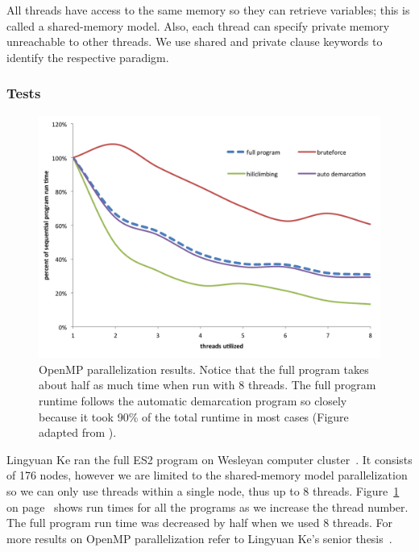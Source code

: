 All threads have access to the same memory so they can retrieve variables; this is called a shared-memory model.
Also, each thread can specify private memory unreachable to other threads.
We use shared and private clause keywords to identify the respective paradigm.

\subsubsection*{Tests}
\begin{figure}[h!]
\centering
\includegraphics[scale=0.6]{images/LingParallelized-CH4}
\caption[OpenMP parallelization results.]{OpenMP parallelization results. Notice that the full program takes about half as much time when run with 8 threads. The full program runtime follows the automatic demarcation program so closely because it took 90\% of the total runtime in most cases (Figure adapted from \protect\cite{lingThesis}).}
\label{fig:LingParallelized}
\end{figure}

Lingyuan Ke ran the full ES2 program on Wesleyan computer cluster~\cite{lingThesis}.
It consists of 176 nodes, however we are limited to the shared-memory model parallelization so we can only use threads within a single node, thus up to 8 threads.
Figure~\ref{fig:LingParallelized} on page~\pageref{fig:LingParallelized} shows run times for all the programs as we increase the thread number.
The full program run time was decreased by half when we used 8 threads.
For more results on OpenMP parallelization refer to Lingyuan Ke's senior thesis~\cite{lingThesis}.

